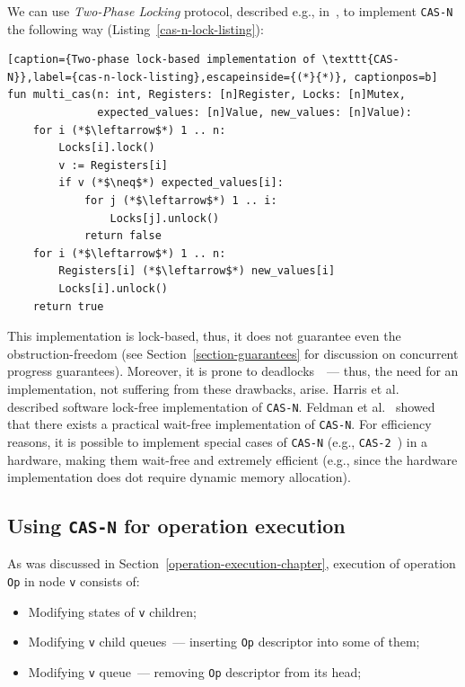 \documentclass[times, dvipsnames,%
               languages={russian,english} %
              ]{itmo-student-thesis}
\begin{document}
We can use \emph{Two-Phase Locking} protocol, described e.g., in~\cite{bernstein1987concurrency}, to implement \texttt{CAS-N} the following way (Listing~\ref{cas-n-lock-listing}):

\renewcommand{\lstlistingname}{Listing}
\begin{lstlisting}[caption={Two-phase lock-based implementation of \texttt{CAS-N}},label={cas-n-lock-listing},escapeinside={(*}{*)}, captionpos=b]
fun multi_cas(n: int, Registers: [n]Register, Locks: [n]Mutex, 
              expected_values: [n]Value, new_values: [n]Value):
    for i (*$\leftarrow$*) 1 .. n:
        Locks[i].lock()
        v := Registers[i]
        if v (*$\neq$*) expected_values[i]:
            for j (*$\leftarrow$*) 1 .. i:
                Locks[j].unlock()
            return false
    for i (*$\leftarrow$*) 1 .. n:
        Registers[i] (*$\leftarrow$*) new_values[i]
        Locks[i].unlock()
    return true
\end{lstlisting}

This implementation is lock-based, thus, it does not guarantee even the obstruction-freedom (see Section~\ref{section-guarantees} for discussion on concurrent progress guarantees). Moreover, it is prone to deadlocks~\cite{bernstein1987concurrency}~--- thus, the need for an implementation, not suffering from these drawbacks, arise. Harris et al.~\cite{harris2002practical} described software lock-free implementation of \texttt{CAS-N}. Feldman et al.~\cite{feldman2015wait} showed that there exists a practical wait-free implementation of \texttt{CAS-N}. For efficiency reasons, it is possible to implement special cases of \texttt{CAS-N} (e.g., \texttt{CAS-2}~\cite{cas-2-wiki}) in a hardware, making them wait-free and extremely efficient (e.g., since the hardware implementation does dot require dynamic memory allocation).

\subsection{Using \texttt{CAS-N} for operation execution}

As was discussed in Section~\ref{operation-execution-chapter}, execution of operation \texttt{Op} in node \texttt{v} consists of:

\begin{itemize}
    \item Modifying states of \texttt{v} children;
    \item Modifying \texttt{v} child queues~--- inserting \texttt{Op} descriptor into some of them;
    \item Modifying \texttt{v} queue~--- removing \texttt{Op} descriptor from its head;
\end{itemize}
\end{document}
